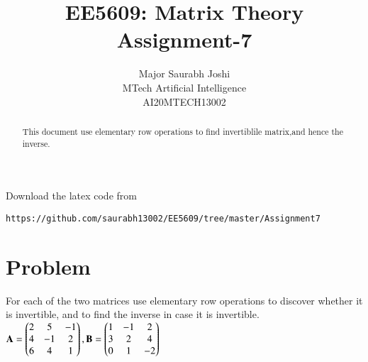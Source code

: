 \documentclass[journal,12pt,twocolumn]{IEEEtran}
\begin{document}
\def\putbox#1#2#3{\makebox[0in][l]{\makebox[#1][l]{}\raisebox{\baselineskip}[0in][0in]{\raisebox{#2}[0in][0in]{#3}}}}
     \def\rightbox#1{\makebox[0in][r]{#1}}
     \def\centbox#1{\makebox[0in]{#1}}
     \def\topbox#1{\raisebox{-\baselineskip}[0in][0in]{#1}}
     \def\midbox#1{\raisebox{-0.5\baselineskip}[0in][0in]{#1}}
\vspace{3cm}
\title{EE5609: Matrix Theory\\
          Assignment-7\\}
\author{Major Saurabh Joshi\\MTech Artificial Intelligence\\AI20MTECH13002 }
\maketitle
\newpage
\bigskip
\renewcommand{\thefigure}{\theenumi}
\renewcommand{\thetable}{\theenumi}
\begin{abstract}
This  document use elementary row operations to find invertiblile matrix,and hence the inverse. 
\end{abstract}
Download the latex code from 
%
%
%
\begin{lstlisting}
https://github.com/saurabh13002/EE5609/tree/master/Assignment7
\end{lstlisting}
%
\section{Problem}
For each of the two matrices use elementary row operations to discover whether it is invertible, and to find the inverse in case it is invertible.\\

$\mathbf{A}=\begin{pmatrix}2&5&-1\\4&-1&2\\6&4&1\end{pmatrix},
\mathbf{B}=\begin{pmatrix}1&-1&2\\3&2&4\\0&1&-2\end{pmatrix}$
\end{document}
